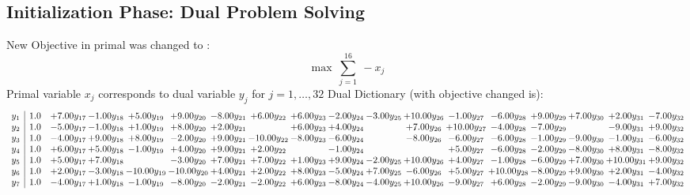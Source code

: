 \documentclass[9pt]{article}
\begin{document}
\subsection{Initialization Phase: Dual Problem Solving}
New Objective in primal was changed to : \[ \max\ \sum_{j=1}^{16}\ - x_j \] 
Primal variable $x_j$ corresponds to dual variable $y_j$ for $j = 1,\ldots,32$
Dual Dictionary (with objective changed is): 
\[\begin{array}{c| c c@{\hskip 2pt} c@{\hskip 2pt} c@{\hskip 2pt} c@{\hskip 2pt} c@{\hskip 2pt} c@{\hskip 2pt} c@{\hskip 2pt} c@{\hskip 2pt} c@{\hskip 2pt} c@{\hskip 2pt} c@{\hskip 2pt} c@{\hskip 2pt} c@{\hskip 2pt} c@{\hskip 2pt} c@{\hskip 2pt} c@{\hskip 2pt} }
 y_{1}   &  1.0 & +  7.00 y_{17} & -1.00 y_{18} & +  5.00 y_{19} & +  9.00 y_{20} & -8.00 y_{21} & +  6.00 y_{22} & +  6.00 y_{23} & -2.00 y_{24} & -3.00 y_{25} & + 10.00 y_{26} & -1.00 y_{27} & -6.00 y_{28} & +  9.00 y_{29} & +  7.00 y_{30} & +  2.00 y_{31} & -7.00 y_{32}\\
 y_{2}   &  1.0 & -5.00 y_{17} & -1.00 y_{18} & +  1.00 y_{19} & +  8.00 y_{20} & +  2.00 y_{21} &   & +  6.00 y_{23} & +  4.00 y_{24} &   & +  7.00 y_{26} & + 10.00 y_{27} & -4.00 y_{28} & -7.00 y_{29} &   & -9.00 y_{31} & +  9.00 y_{32}\\
 y_{3}   &  1.0 & -4.00 y_{17} & +  9.00 y_{18} & +  8.00 y_{19} & -2.00 y_{20} & +  9.00 y_{21} & -10.00 y_{22} & -8.00 y_{23} & -6.00 y_{24} &   & -8.00 y_{26} & -6.00 y_{27} & -6.00 y_{28} & -1.00 y_{29} & -9.00 y_{30} & -1.00 y_{31} & -6.00 y_{32}\\
 y_{4}   &  1.0 & +  6.00 y_{17} & +  5.00 y_{18} & -1.00 y_{19} & +  4.00 y_{20} & +  9.00 y_{21} & +  2.00 y_{22} &   & -1.00 y_{24} &    &   & +  5.00 y_{27} & -6.00 y_{28} & -2.00 y_{29} & -8.00 y_{30} & +  8.00 y_{31} & -8.00 y_{32}\\
 y_{5}   &  1.0 & +  5.00 y_{17} & +  7.00 y_{18} &   & -3.00 y_{20} & +  7.00 y_{21} & +  7.00 y_{22} & +  1.00 y_{23} & +  9.00 y_{24} & -2.00 y_{25} & + 10.00 y_{26} & +  4.00 y_{27} & -1.00 y_{28} & -6.00 y_{29} & +  7.00 y_{30} & + 10.00 y_{31} & +  9.00 y_{32}\\
 y_{6}   &  1.0 & +  2.00 y_{17} & -3.00 y_{18} & -10.00 y_{19} & -10.00 y_{20} & +  4.00 y_{21} & +  2.00 y_{22} & +  8.00 y_{23} & -5.00 y_{24} & +  7.00 y_{25} & -6.00 y_{26} & +  5.00 y_{27} & + 10.00 y_{28} & -8.00 y_{29} & +  9.00 y_{30} & +  2.00 y_{31} & -4.00 y_{32}\\
 y_{7}   &  1.0 & -4.00 y_{17} & +  1.00 y_{18} & -1.00 y_{19} & -8.00 y_{20} & -2.00 y_{21} & -2.00 y_{22} & +  6.00 y_{23} & -8.00 y_{24} & -4.00 y_{25} & + 10.00 y_{26} & -9.00 y_{27} & +  6.00 y_{28} & -2.00 y_{29} & -9.00 y_{30} & -4.00 y_{31} & +  7.00 y_{32}\\

\end{array}\]
\end{document}
